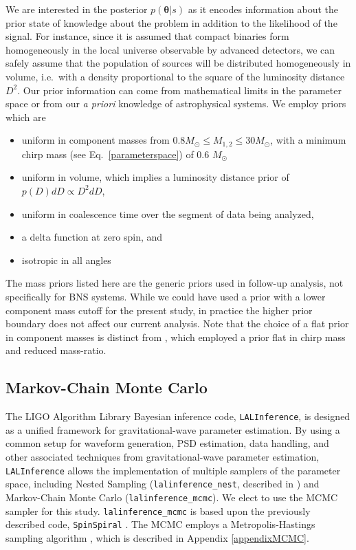 \documentclass[11pt,a4paper]{emulateapj} 
\newcommand{\carl}[1]{{\color{red} #1}}
\newcommand{\thpara}{\boldsymbol{\theta}}
\begin{document}
We are interested in the posterior $p(\thpara | s)$ as it encodes
information about the prior state of knowledge about the problem in
addition to the likelihood of the signal.  For instance, since it is
assumed that compact binaries form homogeneously in the local universe
observable by advanced detectors, we can safely assume that the
population of sources will be distributed homogeneously in volume, i.e.\
with a density proportional to the square of the luminosity distance $D^2$.  
Our prior information can come from mathematical limits in the parameter space 
or from our \textit{a priori} knowledge of astrophysical systems.  
We employ priors which are
\begin{itemize}
\item uniform in component masses from $0.8M_{\odot} \leq M_{1,2} \leq
  30M_{\odot}$, with a minimum chirp mass (see Eq.~\eqref{parameterspace})
  of 0.6 $M_{\odot}$ 
\item uniform in volume, which implies a luminosity distance prior of
  $p(D)dD \propto D^2 dD$,
\item uniform in coalescence time over the segment of data being
  analyzed,
  \item a delta function at zero spin, and
\item isotropic in all angles
\end{itemize}
The mass priors listed here are the generic priors used in follow-up
analysis, not specifically for BNS systems.  While we could have used
a prior with a lower component mass cutoff for the present study, in
practice the higher prior boundary does not affect our current
analysis.  \carl{Note that the choice of a flat prior in component masses is distinct from \cite{Nissanke2013},
 which employed a prior flat in chirp mass and reduced mass-ratio.}


  
\subsection{Markov-Chain Monte Carlo}
\label{MCMCSection}
  
The LIGO Algorithm Library Bayesian inference code,
\texttt{LALInference}, is designed as a unified framework for
gravitational-wave parameter estimation.  By using a common setup for
waveform generation, PSD estimation, data handling, and other
associated techniques from gravitational-wave parameter estimation,
\texttt{LALInference} allows the implementation of multiple samplers
of the parameter space, including Nested Sampling
(\texttt{lalinference\_nest}, described in \cite{nestedsampling2010})
and Markov-Chain Monte Carlo (\texttt{lalinference\_mcmc}).  We elect
to use the MCMC sampler for this study.  \texttt{lalinference\_mcmc}
is based upon the previously described code, \texttt{SpinSpiral}
\citep{spinspiral2009, spinspiral2010}.  The MCMC employs a
Metropolis-Hastings sampling algorithm \citep{Gilks99}, which is described in 
Appendix \ref{appendixMCMC}.
\end{document}
